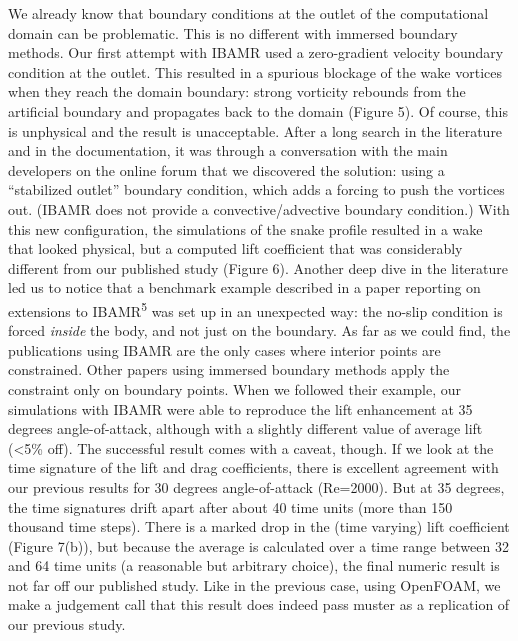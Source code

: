 \documentclass[9pt,twocolumn,twoside]{article}
\newlength{\up}
\begin{document}
We already know that boundary conditions at the outlet of the computational domain can be problematic. This is no different with immersed boundary methods. 
Our first attempt with IBAMR used a zero-gradient velocity boundary condition at the outlet. 
This resulted in a spurious blockage of the wake vortices when they reach the domain boundary: strong vorticity rebounds from the artificial boundary and propagates back to the domain (Figure 5). 
Of course, this is unphysical and the result is unacceptable. 
After a long search in the literature and in the documentation, it was through a conversation with the main developers on the online forum that we discovered the solution: using a ``stabilized outlet'' boundary condition, which adds a forcing to push the vortices out.
(IBAMR does not provide a convective/advective boundary condition.) 
With this new configuration, the simulations of the snake profile resulted in a wake that looked physical, but a computed lift coefficient that was considerably different from our published study (Figure 6). 
Another deep dive in the literature led us to notice that a benchmark example described in a paper reporting  on extensions to IBAMR\textsuperscript{5} was set up in an unexpected way: 
the no-slip condition is forced \textit{inside} the body, and not just on the boundary. 
As far as we could find, the publications using IBAMR are the only cases where interior points are constrained. 
Other papers using immersed boundary methods apply the constraint only on boundary points.
When we followed their example, our simulations with IBAMR were able to reproduce the lift enhancement at 35 degrees angle-of-attack, although with a slightly different value of average lift (<5\% off). 
The successful result comes with a caveat, though. 
If we look at the time signature of the lift and drag coefficients, there is excellent agreement with our previous results for 30 degrees angle-of-attack (Re=2000). 
But at 35 degrees, the time signatures drift apart after about 40 time units (more than 150 thousand time steps). 
There is a marked drop in the (time varying) lift coefficient (Figure 7(b)), but because the average is calculated over a time range between 32 and 64 time units (a reasonable but arbitrary choice), the final numeric result is not far off our published study. 
Like in the previous case, using OpenFOAM, we make a judgement call that this result does indeed pass muster as a replication of our previous study. 
 
\end{document}
